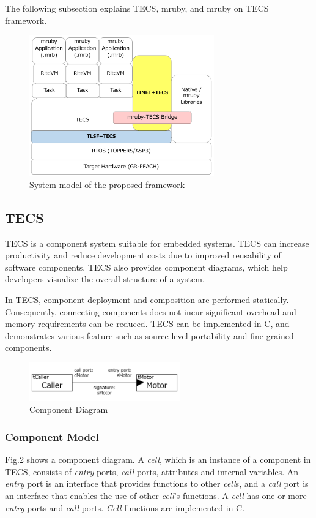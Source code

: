 \documentclass[JIP]{ipsj_v2/UTF8/ipsj}
\begin{document}
The following subsection explains TECS, mruby, and mruby on TECS framework.


\begin{figure}[t]
    \centering
    \includegraphics[width=8.0cm,clip]{figure/SystemModel.pdf}
    \caption{System model of the proposed framework}
    \label{fig:SystemModel}
\end{figure}

\subsection{TECS}
\label{sec:TECS}

TECS is a component system suitable for embedded systems.
TECS can increase productivity and reduce development costs due to improved reusability of software components.
TECS also provides component diagrams, which help developers visualize the overall structure of a system.

In TECS, component deployment and composition are performed statically.
Consequently, connecting components does not incur significant overhead and memory requirements can be reduced.
TECS can be implemented in C, and demonstrates various feature such as source level portability and fine-grained components.

\begin{figure}[t]
    \centering
    \includegraphics[width=6.5cm,clip]{figure/component_diagram.pdf}
    \caption{Component Diagram}
    \label{fig:component}
\end{figure}

\subsubsection{Component Model}
Fig.\ref{fig:component} shows a component diagram.
A {\it cell}, which is an instance of a component in TECS, consists of {\it entry} ports, {\it call} ports, attributes and internal variables.
An {\it entry} port is an interface that provides functions to other {\it cell}s, and a {\it call} port is an interface that enables the use of other {\it cell}'s functions.
A {\it cell} has one or more {\it entry} ports and {\it call} ports.
{\it Cell} functions are implemented in C.
\end{document}
